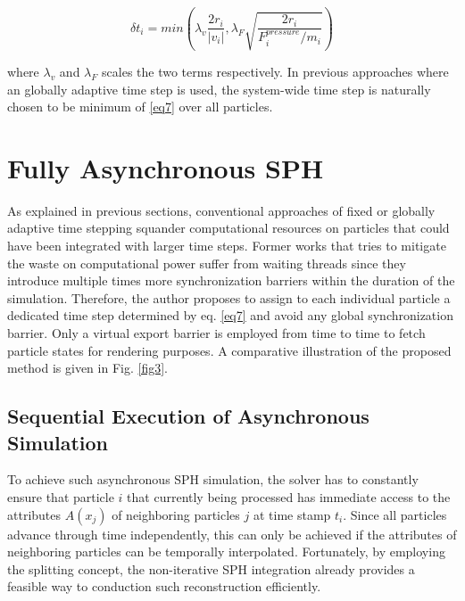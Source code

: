 \documentclass[
	11pt, 
	DIV10,
	ngerman,
	a4paper, 
	oneside, 
	headings=normal, 
	captions=tableheading,
	final, 
	numbers=noenddot
]{scrartcl}
\begin{document}
\begin{equation}
	\label{eq7}
	\delta t_{i} = min(\lambda_{v}\frac{2r_{i}}{|v_{i}|}, \lambda_{F}\sqrt{\frac{2r_{i}}{F_{i}^{pressure}/m_{i}}})
\end{equation}

where $ \lambda_{v} $ and $ \lambda_{F} $ scales the two terms respectively. In previous approaches where an globally adaptive time step is used, the system-wide time step is naturally chosen to be minimum of \ref{eq7} over all particles.


\section{Fully Asynchronous SPH}

As explained in previous sections, conventional approaches of fixed or globally adaptive time stepping squander computational resources on particles that could have been integrated with larger time steps. Former works that tries to mitigate the waste on computational power suffer from waiting threads since they introduce multiple times more synchronization barriers within the duration of the simulation. Therefore, the author proposes to assign to each individual particle a dedicated time step determined by eq. \ref{eq7} and avoid any global synchronization barrier. Only a virtual export barrier is employed from time to time to fetch particle states for rendering purposes. A comparative illustration of the proposed method is given in Fig. \ref{fig3}.

\subsection{Sequential Execution of Asynchronous Simulation}

To achieve such asynchronous SPH simulation, the solver has to constantly ensure that particle $ i $ that currently being processed has immediate access to the attributes $ A(x_{j}) $ of neighboring particles $ j $ at time stamp $ t_{i} $. Since all particles advance through time independently, this can only be achieved if the attributes of neighboring particles can be temporally interpolated. Fortunately, by employing the splitting concept, the non-iterative SPH integration already provides a feasible way to conduction such reconstruction efficiently.
\end{document}
